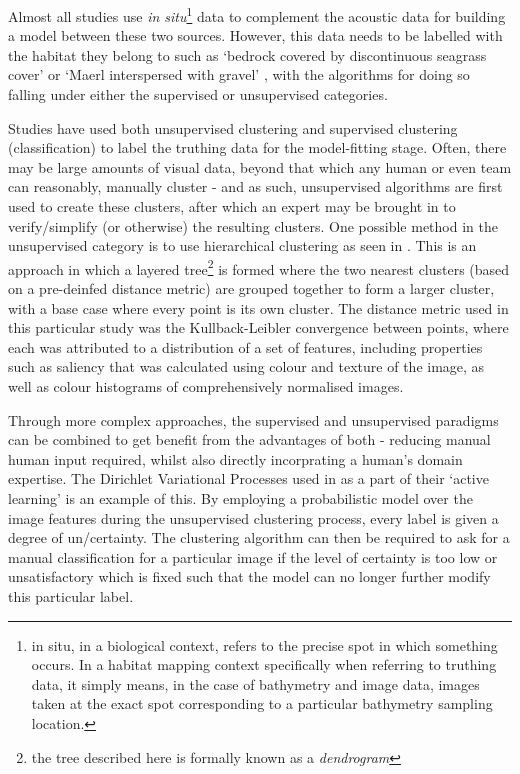 Almost all studies use \textit{in situ}\footnote{in situ, in a biological context, refers to the precise spot in which something occurs. In a habitat mapping context specifically when referring to truthing data, it simply means, in the case of bathymetry and image data, images taken at the exact spot corresponding to a particular bathymetry sampling location.} data to complement the acoustic data for building a model between these two sources. However, this data needs to be labelled with the habitat they belong to such as `bedrock covered by discontinuous seagrass cover' or `Maerl interspersed with gravel' \citep{micallef12}, with the algorithms for doing so falling under either the supervised or unsupervised categories.

Studies have used both unsupervised clustering and supervised clustering (classification) to label the truthing data for the model-fitting stage. Often, there may be large amounts of visual data, beyond that which any human or even team can reasonably, manually cluster - and as such, unsupervised algorithms are first used to create these clusters, after which an expert may be brought in to verify/simplify (or otherwise) the resulting clusters. One possible method in the unsupervised category is to use hierarchical clustering as seen in \citet{pizarro09}. This is an approach in which a layered tree\footnote{the tree described here is formally known as a \textit{dendrogram}} is formed where the two nearest clusters (based on a pre-deinfed distance metric) are grouped together to form a larger cluster, with a base case where every point is its own cluster. The distance metric used in this particular study was the Kullback-Leibler convergence between points, where each was attributed to a distribution of a set of features, including properties such as saliency that was calculated using colour and texture of the image, as well as colour histograms of comprehensively normalised images.

Through more complex approaches, the supervised and unsupervised paradigms can be combined to get benefit from the advantages of both - reducing manual human input required, whilst also directly incorprating a human's domain expertise. The Dirichlet Variational Processes used in \citep{friedman11} as a part of their `active learning' is an example of this. By employing a probabilistic model over the image features during the unsupervised clustering process, every label is given a degree of un/certainty. The clustering algorithm can then be required to ask for a manual classification for a particular image if the level of certainty is too low or unsatisfactory which is fixed such that the model can no longer further modify this particular label.

